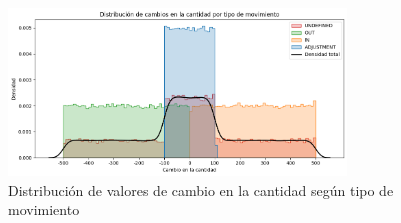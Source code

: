 \begin{figure}[H]
    \centering
    \includegraphics[width=0.8\textwidth]{imagenes/datos_uniformes/distribucion_tipos_de_mov.png}
    \caption{Distribución de valores de cambio en la cantidad según tipo de movimiento}
    \label{fig:distribucion_tipos_de_mov}
\end{figure}